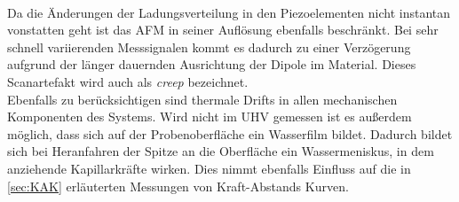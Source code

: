 \\
Da die Änderungen der Ladungsverteilung in den Piezoelementen nicht instantan vonstatten geht ist das AFM in seiner Auflösung ebenfalls beschränkt. Bei sehr schnell variierenden Messsignalen kommt es dadurch zu einer Verzögerung aufgrund der länger dauernden Ausrichtung der Dipole im Material. Dieses Scanartefakt wird auch als \textit{creep} bezeichnet.
\\
Ebenfalls zu berücksichtigen sind thermale Drifts in allen mechanischen Komponenten des Systems. Wird nicht im UHV gemessen ist es außerdem möglich, dass sich auf der Probenoberfläche ein Wasserfilm bildet. Dadurch bildet sich bei Heranfahren der Spitze an die Oberfläche ein Wassermeniskus, in dem anziehende Kapillarkräfte wirken. Dies nimmt ebenfalls Einfluss auf die in \autoref{sec:KAK} erläuterten Messungen von Kraft-Abstands Kurven.\\
\newpage
